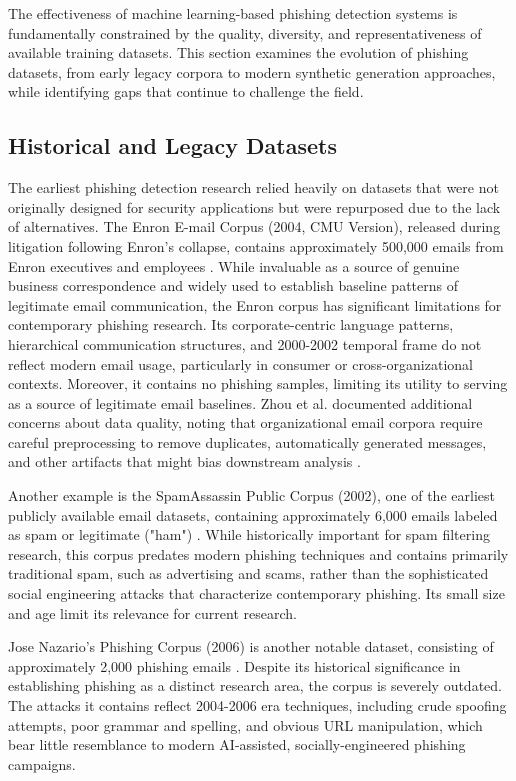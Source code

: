 The effectiveness of machine learning-based phishing detection systems is fundamentally constrained by the quality, diversity, and representativeness of available training datasets. This section examines the evolution of phishing datasets, from early legacy corpora to modern synthetic generation approaches, while identifying gaps that continue to challenge the field.

\subsection{Historical and Legacy Datasets}

The earliest phishing detection research relied heavily on datasets that were not originally designed for security applications but were repurposed due to the lack of alternatives. The Enron E-mail Corpus (2004, CMU Version), released during litigation following Enron's collapse, contains approximately 500,000 emails from Enron executives and employees \cite{klimt2004enron}. While invaluable as a source of genuine business correspondence and widely used to establish baseline patterns of legitimate email communication, the Enron corpus has significant limitations for contemporary phishing research. Its corporate-centric language patterns, hierarchical communication structures, and 2000-2002 temporal frame do not reflect modern email usage, particularly in consumer or cross-organizational contexts. Moreover, it contains no phishing samples, limiting its utility to serving as a source of legitimate email baselines. Zhou et al. documented additional concerns about data quality, noting that organizational email corpora require careful preprocessing to remove duplicates, automatically generated messages, and other artifacts that might bias downstream analysis \cite{zhou2007strategies}.

Another example is the SpamAssassin Public Corpus (2002), one of the earliest publicly available email datasets, containing approximately 6,000 emails labeled as spam or legitimate ("ham") \cite{metsis2006spam}. While historically important for spam filtering research, this corpus predates modern phishing techniques and contains primarily traditional spam, such as advertising and scams, rather than the sophisticated social engineering attacks that characterize contemporary phishing. Its small size and age limit its relevance for current research.

Jose Nazario's Phishing Corpus (2006) is another notable dataset, consisting of approximately 2,000 phishing emails \cite{nazario2006phishing}. Despite its historical significance in establishing phishing as a distinct research area, the corpus is severely outdated. The attacks it contains reflect 2004-2006 era techniques, including crude spoofing attempts, poor grammar and spelling, and obvious URL manipulation, which bear little resemblance to modern \ac{AI}-assisted, socially-engineered phishing campaigns.

